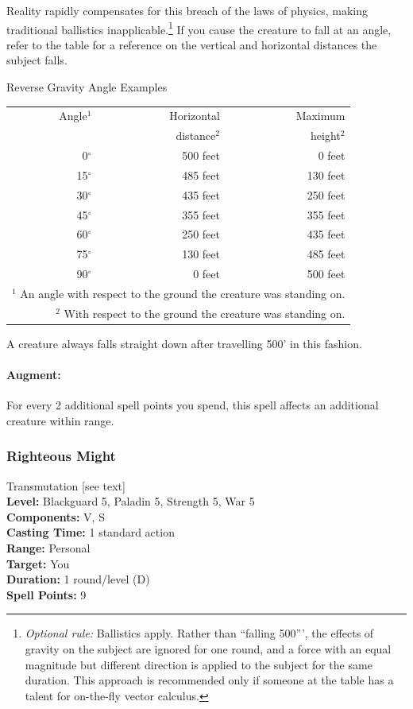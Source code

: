 Reality rapidly compensates for this breach of the laws of physics, making traditional ballistics inapplicable.\footnote{\emph{Optional rule:}
Ballistics apply. Rather than ``falling 500''', the effects of gravity on the subject are ignored for one round, and a force with an equal magnitude
but different direction is applied to the subject for the same duration. 
This approach is recommended only if someone at the table has a talent for on-the-fly vector calculus.}
If you cause the creature to fall at an angle, 
refer to the  table for a reference on the vertical and horizontal distances the subject falls.
\begin{tableonecolumn}
\caption{Reverse Gravity Angle Examples}
\label{tab:ReverseGravity}
\begin{tabular}{|r|r|r|}
\hline
Angle$^1$&Horizontal&Maximum\\
&distance$^2$&height$^2$\\
\hline
 0$^\circ$&500 feet&  0 feet\\
15$^\circ$&485 feet&130 feet\\
30$^\circ$&435 feet&250 feet\\
45$^\circ$&355 feet&355 feet\\
60$^\circ$&250 feet&435 feet\\
75$^\circ$&130 feet&485 feet\\
90$^\circ$&  0 feet&500 feet\\
\hline
\multicolumn{3}{p{5cm}}{\small $^1$ An angle with respect to the ground the creature was standing on.}\\
\multicolumn{3}{p{5cm}}{\small $^2$ With respect to the ground the creature was standing on.}
\end{tabular}
\end{tableonecolumn}
A creature always falls straight down after travelling 500' in this fashion.

\paragraph{Augment:} For every 2 additional spell points you spend, this spell affects an additional creature within range.
\subsubsection{Righteous Might}
\label{Spell:RighteousMight}
Transmutation [see text]
\\ \textbf{Level:} Blackguard 5, Paladin 5, Strength 5, War 5
\\ \textbf{Components:} V, S
\\ \textbf{Casting Time:} 1 standard action
\\ \textbf{Range:} Personal
\\ \textbf{Target:} You
\\ \textbf{Duration:} 1 round/level (D)
\\ \textbf{Spell Points:} 9

